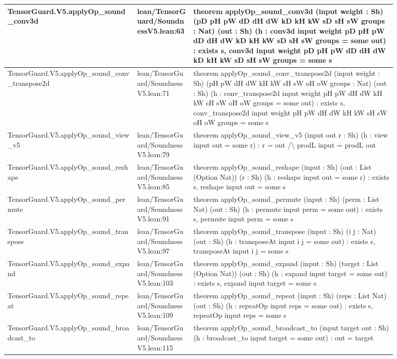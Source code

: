 \documentclass[10pt]{article}
\begin{document}
\begin{longtable}{|p{0.30\linewidth}|p{0.13\linewidth}|p{0.47\linewidth}|}
\hline
TensorGuard.V5.applyOp\_sound\_conv3d & lean/TensorGuard/SoundnessV5.lean:63 & theorem applyOp\_sound\_conv3d (input weight : Sh) (pD pH pW dD dH dW kD kH kW sD sH sW groups : Nat) (out : Sh) (h : conv3d input weight pD pH pW dD dH dW kD kH kW sD sH sW groups = some out) : exists s, conv3d input weight pD pH pW dD dH dW kD kH kW sD sH sW groups = some s \\
\hline
TensorGuard.V5.applyOp\_sound\_conv\_transpose2d & lean/TensorGuard/SoundnessV5.lean:71 & theorem applyOp\_sound\_conv\_transpose2d (input weight : Sh) (pH pW dH dW kH kW sH sW oH oW groups : Nat) (out : Sh) (h : conv\_transpose2d input weight pH pW dH dW kH kW sH sW oH oW groups = some out) : exists s, conv\_transpose2d input weight pH pW dH dW kH kW sH sW oH oW groups = some s \\
\hline
TensorGuard.V5.applyOp\_sound\_view\_v5 & lean/TensorGuard/SoundnessV5.lean:79 & theorem applyOp\_sound\_view\_v5 (input out r : Sh) (h : view input out = some r) : r = out /\textbackslash{} prodL input = prodL out \\
\hline
TensorGuard.V5.applyOp\_sound\_reshape & lean/TensorGuard/SoundnessV5.lean:85 & theorem applyOp\_sound\_reshape (input : Sh) (out : List (Option Nat)) (r : Sh) (h : reshape input out = some r) : exists s, reshape input out = some s \\
\hline
TensorGuard.V5.applyOp\_sound\_permute & lean/TensorGuard/SoundnessV5.lean:91 & theorem applyOp\_sound\_permute (input : Sh) (perm : List Nat) (out : Sh) (h : permute input perm = some out) : exists s, permute input perm = some s \\
\hline
TensorGuard.V5.applyOp\_sound\_transpose & lean/TensorGuard/SoundnessV5.lean:97 & theorem applyOp\_sound\_transpose (input : Sh) (i j : Nat) (out : Sh) (h : transposeAt input i j = some out) : exists s, transposeAt input i j = some s \\
\hline
TensorGuard.V5.applyOp\_sound\_expand & lean/TensorGuard/SoundnessV5.lean:103 & theorem applyOp\_sound\_expand (input : Sh) (target : List (Option Nat)) (out : Sh) (h : expand input target = some out) : exists s, expand input target = some s \\
\hline
TensorGuard.V5.applyOp\_sound\_repeat & lean/TensorGuard/SoundnessV5.lean:109 & theorem applyOp\_sound\_repeat (input : Sh) (reps : List Nat) (out : Sh) (h : repeatOp input reps = some out) : exists s, repeatOp input reps = some s \\
\hline
TensorGuard.V5.applyOp\_sound\_broadcast\_to & lean/TensorGuard/SoundnessV5.lean:115 & theorem applyOp\_sound\_broadcast\_to (input target out : Sh) (h : broadcast\_to input target = some out) : out = target \\

\end{longtable}
\end{document}
